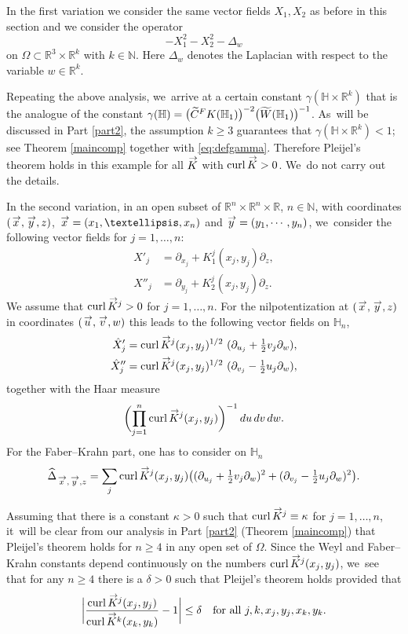 \documentclass[11pt]{article}
\newcommand{\FK}{\textup{FK}}
\DeclareMathOperator{\curl}{curl}
\renewcommand{\vec}[1]
{\overset{\,{\raisebox{-2pt}{$\scriptstyle\to$}}}{#1}}
\theoremstyle{definition}
\newcommand{\1}{\mathbbm{1}}
\newcommand{\N}{\mathbb{N}}
\newcommand{\R}{\mathbb{R}}
\numberwithin{equation}{section}
\begin{document}
In the first variation we consider the same vector fields $X_1,X_2$ as before in this section and we consider the operator
\[
-X_1^2 - X_2^2 -\Delta_w
\]
on $\Omega \subset \R^3 \times \mathbb R^k$ with $k\in\N$. Here $\Delta_w$ denotes the Laplacian with respect to the variable $w\in\R^k$.

Repeating the above analysis, we~arrive at a certain constant $\gamma (\mathbb H \times \mathbb R^k)$ that is the analogue of the constant $\gamma (\mathbb H) = \bigl(\widetilde C^\FK(\mathbb H_1)\bigr)^{-2} \bigl(\widetilde W (\mathbb H_1)\bigr)^{-1}$. As~will be discussed in Part \ref{part2}, the assumption $k\geq 3$ guarantees that $\gamma (\mathbb H \times \mathbb R^k)<1$; see Theorem \ref{maincomp} together with \eqref{eq:defgamma}. Therefore Pleijel's theorem holds in this example for all $\vec K$ with $\curl\vec K>0$. We~do not carry out the details.

In the second variation, in an open subset of $\R^n\times\R^n\times\R$, $n\in\mathbb N$, with coordinates $(\vec x,\vec y,z)$, $\vec x =(x_1,\dots,x_n)$ and $\vec y=(y_1,\cdots, y_n)$, we~consider the following vector fields for $j=1,\ldots, n$:
\begin{align*}
X'_j&= \partial_{x_j} + K_1^j (x_j,y_j) \partial_z,\\
X''_j& = \partial_{y_j} + K_2^j (x_j,y_j) \partial_z.
\end{align*}
We assume that $\curl \vec K{}^j >0$ for $j=1,\ldots, n$.
For the nilpotentization at $(\vec x,\vec y,z)$ in coordinates $(\vec u,\vec v,w)$ this leads to the following vector fields on $\mathbb H_n$,
\begin{align*}
\hat X'_j & = \curl\vec K{}^j(x_j,y_j)^{1/2} \ (\partial _{u_j} +\tfrac 12 v_j \partial_w),\\
\hat X''_j& = \curl\vec K{}^j(x_j,y_j)^{1/2} \ (\partial _{v_j} - \tfrac 12 u_j \partial_w),
\end{align*}
together with the Haar measure
\[
\biggl(\prod_{j=1}^n \curl \vec K{}^j(x_j,y_j) \biggr)^{-1} \,du\,dv\,dw.
\]
For the Faber--Krahn part, one has to consider on $\mathbb H_n$
\[
\widehat \Delta_{\vec x,\vec y,z}= \sum_j \curl \vec K{}^j(x_j,y_j) \bigl((\partial _{u_j} + \tfrac{ 1}{2} v_j \partial_w)^2+(\partial _{v_j} - \tfrac {1}{2}u_j\partial_w)^2 \bigr).
\]

Assuming that there is a constant $\kappa>0$ such that $\curl \vec K{}^j \equiv \kappa$ for $j=1,\ldots,n$, it~will be clear from our analysis in Part \ref{part2} (Theorem \ref{maincomp}) that Pleijel's theorem holds for $n\geq 4$ in any open set of $\Omega$. Since the Weyl and Faber--Krahn constants depend continuously on the numbers $\curl \vec K{}^j(x_j,y_j)$, we~see that for any $n\geq 4$ there is a $\delta>0$ such that Pleijel's theorem holds provided that
\[
\biggl| \frac{\curl \vec K{}^j(x_j,y_j)}{\curl \vec K{}^k(x_k,y_k)} - 1\biggr| \leq \delta
\quad\text{for all}\ j, k, x_j,y_j, x_k,y_k.
\]
\end{document}

